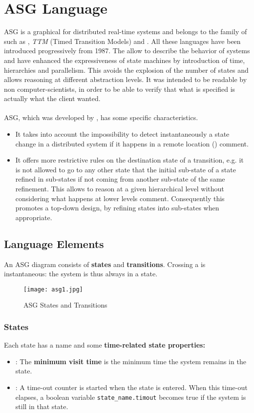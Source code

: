 \documentclass[../main.tex]{subfiles}
\begin{document}
\chapter{ASG Language}
ASG is a graphical  for distributed real-time systems and belongs to the family of  such as \textit{}, \textit{TTM} (Timed Transition Models) and \textit{}.
All these languages have been introduced progressively from 1987.
The allow to describe the behavior of systems and have enhanced the expressiveness of state machines by introduction of time, hierarchies and parallelism.
This avoids the explosion of the number of states and allows reasoning at different abstraction levels.
It was intended to be readable by non computer-scientists, in order to be able to verify that what is specified is actually what the client wanted.
\\\\
ASG, which was developed by , has some specific characteristics.
\begin{itemize}
	\item It takes into account the impossibility to detect instantaneously a state change in a distributed system if it happens in a remote location () comment.
	\item It offers more restrictive rules on the destination state of a transition, e.g. it is not allowed to go to any other state that the initial sub-state of a state refined in sub-states if not coming from another sub-state of the same refinement.
    This allows to reason at a given hierarchical level without considering what happens at lower levels  comment.
    Consequently this promotes a top-down design, by refining states into sub-states when appropriate.
\end{itemize}

\section{Language Elements}
An ASG diagram consists of \textbf{states} and \textbf{transitions}. Crossing a  is instantaneous: the system is thus always in a state.
\begin{figure}[H]
    \centering
    \texttt{[image: asg1.jpg]}
    \caption{ASG States and Transitions}
    \label{asg1}
\end{figure}

\subsection{States}
Each state has a name and some \textbf{time-related state properties:}
\begin{itemize}
	\item {}: The \textbf{minimum visit time} is the minimum time the system remains in the state.
	\item {}: A time-out counter is started when the state is entered. When this time-out elapses, a boolean variable \texttt{state\_name.timout} becomes true if the system is still in that state.
\end{itemize}
\end{document}
